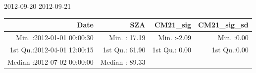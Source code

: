 \documentclass[
  10pt,
  a4paper,oneside]{article}
\begin{document}
2012-09-20 2012-09-21

\footnotesize

\begin{longtable}[]{@{}rrrr@{}}
\toprule
\begin{minipage}[b]{0.34\columnwidth}\raggedleft
Date\strut
\end{minipage} & \begin{minipage}[b]{0.19\columnwidth}\raggedleft
SZA\strut
\end{minipage} & \begin{minipage}[b]{0.18\columnwidth}\raggedleft
CM21\_sig\strut
\end{minipage} & \begin{minipage}[b]{0.18\columnwidth}\raggedleft
CM21\_sig\_sd\strut
\end{minipage}\tabularnewline
\midrule
\endhead
\begin{minipage}[t]{0.34\columnwidth}\raggedleft
Min. :2012-01-01 00:00:30\strut
\end{minipage} & \begin{minipage}[t]{0.19\columnwidth}\raggedleft
Min. : 17.19\strut
\end{minipage} & \begin{minipage}[t]{0.18\columnwidth}\raggedleft
Min. :-2.09\strut
\end{minipage} & \begin{minipage}[t]{0.18\columnwidth}\raggedleft
Min. :0.00\strut
\end{minipage}\tabularnewline
\begin{minipage}[t]{0.34\columnwidth}\raggedleft
1st Qu.:2012-04-01 12:00:15\strut
\end{minipage} & \begin{minipage}[t]{0.19\columnwidth}\raggedleft
1st Qu.: 61.90\strut
\end{minipage} & \begin{minipage}[t]{0.18\columnwidth}\raggedleft
1st Qu.: 0.00\strut
\end{minipage} & \begin{minipage}[t]{0.18\columnwidth}\raggedleft
1st Qu.:0.00\strut
\end{minipage}\tabularnewline
\begin{minipage}[t]{0.34\columnwidth}\raggedleft
Median :2012-07-02 00:00:00\strut
\end{minipage} & \begin{minipage}[t]{0.19\columnwidth}\raggedleft
Median : 89.33\strut
\end{minipage} & \begin{minipage}[t]{0.18\columnwidth}\raggedleft

\end{minipage}
\end{longtable}
\end{document}
